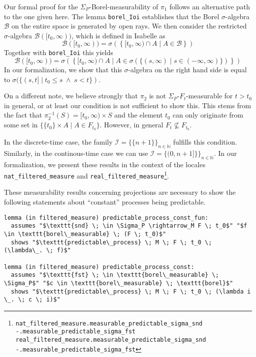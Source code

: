 \begin{remark}
	Our formal proof for the $\Sigma_P$-Borel-measurability of $\pi_1$ follows an alternative path to the one given here. The lemma \texttt{borel\_Ioi} establishes that the Borel $\sigma$-algebra  $\mathcal{B}$ on the entire space is generated by open rays. We then consider the restricted $\sigma$-algebra $\mathcal{B}([t_0,\infty))$, which is defined in Isabelle as
	\[
		\mathcal{B}([t_0,\infty)) = \sigma\left(\left\{[t_0, \infty) \cap A \;\vert\; A \in \mathcal{B}\right\}\right)
	\]
	Together with \texttt{borel\_Ioi} this yields
	\[
	 	\mathcal{B}([t_0,\infty)) = \sigma\left(\left\{[t_0, \infty) \cap A \;\vert\; A \in \sigma(\{(s,\infty) \;\vert\; s \in (-\infty,\infty)\})\right\}\right)
	\]
	In our formalization, we show that this $\sigma$-algebra on the right hand side is equal to $\sigma(\{(s,t] \;\vert\; t_0 \le s \;\wedge\; s < t\})$.
	
	On a different note, we believe strongly that $\pi_2$ is not $\Sigma_P$-$F_t$-measurable for $t > t_0$ in general, or at least our condition is not sufficient to show this. This stems from the fact that $\pi_2^{-1}(S) = [t_0, \infty) \times S$ and the element $t_0$ can only originate from some set in $\{\{t_0\} \times A \;\vert\; A \in F_{t_0}\}$. However, in general $F_t \not\subseteq F_{t_0}$.
\end{remark}

In the discrete-time case, the family $\mathcal{I} = \{\{n + 1\}\}_{n \in \mathbb{N}}$ fulfills this condition. Similarly, in the continous-time case we can use $\mathcal{I} = \{(0,n + 1]\}\}_{n \in \mathbb{N}}$. In our formalization, we present these results in the context of the locales \texttt{nat\_filtered\_measure} and \texttt{real\_filtered\_measure}\footnote{\texttt{nat\_filtered\_measure.measurable\_predictable\_sigma\_snd} \quad \texttt{-.measurable\_predictable\_sigma\_fst} \\\texttt{real\_filtered\_measure.measurable\_predictable\_sigma\_snd} \quad \texttt{-.measurable\_predictable\_sigma\_fst}}.

These measurability results concerning projections are necessary to show the following statements about ``constant'' processes being predictable.

\begin{isalemma}
{\small
\begin{lstlisting}[style=isabelle]
lemma (in filtered_measure) predictable_process_const_fun:
  assumes "$\texttt{snd} \; \in \Sigma_P \rightarrow_M F \; t_0$" "$f \in \texttt{borel\_measurable} \; (F \; t_0)$"
  shows "$\texttt{predictable\_process} \; M \; F \; t_0 \; (\lambda\_. \; f)$"

lemma (in filtered_measure) predictable_process_const:
  assumes "$\texttt{fst} \; \in \texttt{borel\_measurable} \; \Sigma_P$" "$c \in \texttt{borel\_measurable} \; \texttt{borel}$"
  shows "$\texttt{predictable\_process} \; M \; F \; t_0 \; (\lambda i \_. \; c \; i)$"
\end{lstlisting}
}
\end{isalemma}


